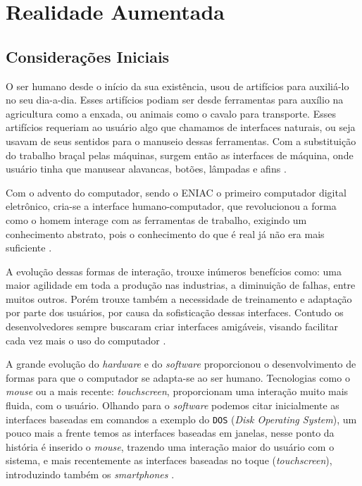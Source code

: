 \chapter {Realidade Aumentada}
\label{cap:XXX}

\section {Considerações Iniciais}
O ser humano desde o início da sua existência, usou de artifícios para auxiliá-lo no seu dia-a-dia. Esses
artifícios podiam ser desde ferramentas para auxílio na agricultura como a enxada, ou animais como o cavalo
para transporte. Esses artifícios requeriam ao usuário algo que chamamos de interfaces naturais, ou seja
usavam de seus sentidos para o manuseio dessas ferramentas. Com a substituição do trabalho braçal pelas
máquinas, surgem então as interfaces de máquina, onde usuário tinha que manusear alavancas, botões, lâmpadas e
afins \cite{kirner2007}.

Com o advento do computador, sendo o ENIAC o primeiro computador digital eletrônico, cria-se a interface
humano-computador, que revolucionou a forma como o homem interage com as ferramentas de trabalho, exigindo um
conhecimento abstrato, pois o conhecimento do que é real já não era mais suficiente \cite{eniac,kirner2007}.

A evolução dessas formas de interação, trouxe inúmeros benefícios como: uma maior agilidade em toda a produção
nas industrias, a diminuição de falhas, entre muitos outros. Porém trouxe também a necessidade de treinamento
e adaptação por parte dos usuários, por causa da sofisticação dessas interfaces. Contudo os desenvolvedores
sempre buscaram criar interfaces amigáveis, visando facilitar cada vez mais o uso do computador
\cite{kirner2007}.

A grande evolução do \textit{hardware} e do \textit{software} proporcionou o desenvolvimento de formas para
que o computador se adapta-se ao ser humano. Tecnologias como o \textit{mouse} ou a mais recente:
\textit{touchscreen}, proporcionam uma interação muito mais fluida, com o usuário. Olhando para o
\textit{software} podemos citar inicialmente as interfaces baseadas em comandos a exemplo do \verb'DOS'
(\textit{Disk Operating System}), um pouco mais a frente temos as interfaces baseadas em janelas, nesse ponto
da história é inserido o \textit{mouse}, trazendo uma interação maior do usuário com o sistema, e mais
recentemente as interfaces baseadas no toque (\textit{touchscreen}), introduzindo também os
\textit{smartphones} \cite{kirner2007}.

